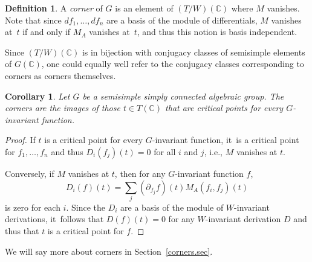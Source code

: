 \documentclass[JEP,XML,SOM,Unicode,NoFloatCountersInSection,published]{cedram}
\newtheorem{cor}[equation]{Corollary}
\theoremstyle{definition}
\newtheorem{defn}[equation]{Definition}
\newcommand{\C}{\mathbb{C}}
\begin{document}
\begin{defn}
A \emph{corner} of $G$ is an element of $(T/W)(\C)$ where $M$ vanishes. Note that since $df_1,\ldots, df_n$ are a basis of the module of differentials, $M$ vanishes at~$t$ if and only if $M_A$ vanishes at~$t$, and thus this notion is basis independent.
\end{defn}

Since $(T/W)(\C)$ is in bijection with conjugacy classes of semisimple elements of $G(\C)$, one could equally well refer to the conjugacy classes corresponding to corners as corners themselves.

\begin{cor} \label{corner.crit}
Let $G$ be a semisimple simply connected algebraic group. The corners are the images of those $t \in T(\C)$ that are critical points for every $G$-invariant function.
\end{cor}

\begin{proof}
If $t$ is a critical point for every $G$-invariant function, it~is a critical point for $f_1,\ldots, f_n$ and thus $D_i(f_j)(t) = 0$ for all $i$ and $j$, i.e., $M$ vanishes at $t$.

Conversely, if $M$ vanishes at $t$, then for any $G$-invariant
function $f$,
\[
D_i(f)(t)
=
\sum_j (\partial_{f_j}f)(t) M_A(f_i,f_j)(t)
\]
is zero for each $i$. Since the $D_i$ are a basis of the module of
$W$-invariant derivations, it~follows that $D(f)(t)=0$ for any
$W$-invariant derivation $D$ and thus that $t$ is a critical point for $f$.
\end{proof}

We will say more about corners in Section~\ref{corners.sec}.
\end{document}
